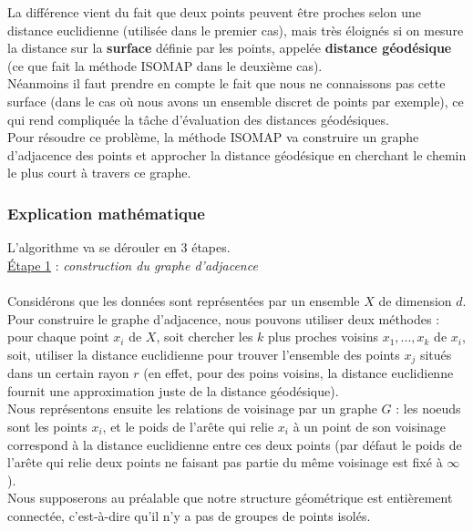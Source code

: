 \documentclass[12pt]{report}
\begin{document}
\noindent La différence vient du fait que deux points peuvent être proches selon une distance euclidienne (utilisée dans le premier cas), mais très éloignés si on mesure la distance sur la \textbf{surface} définie par les points, appelée \textbf{distance géodésique} (ce que fait la méthode ISOMAP dans le deuxième cas).\\

\noindent Néanmoins il faut prendre en compte le fait que nous ne connaissons pas cette surface (dans le cas où nous avons un ensemble discret de points par exemple), ce qui rend compliquée la tâche d'évaluation des distances géodésiques.\\
Pour résoudre ce problème, la méthode ISOMAP va construire un graphe d'adjacence des points et approcher la distance géodésique en cherchant le chemin le plus court à travers ce graphe.

\subsubsection{Explication mathématique}

\noindent L'algorithme va se dérouler en 3 étapes.\\

\noindent \underline{\'Etape 1} : \textit{construction du graphe d'adjacence}\\ \\
Considérons que les données sont représentées par un ensemble $X$ de dimension $d$.\\
Pour construire le graphe d'adjacence, nous pouvons utiliser deux méthodes : pour chaque point $x_{i}$ de $X$, soit chercher les $k$ plus proches voisins $x_{1},...,x_{k}$ de $x_{i}$, soit,  utiliser la distance euclidienne pour trouver l'ensemble des points $x_{j}$ situés dans un certain rayon $r$ (en effet, pour des poins voisins, la distance euclidienne fournit une approximation juste de la distance géodésique).\\
Nous représentons ensuite les relations de voisinage par un graphe $G$ : les noeuds sont les points $x_{i}$, et le poids de l'arête qui relie $x_{i}$ à un point de son voisinage correspond à la distance euclidienne entre ces deux points (par défaut le poids de l'arête qui relie deux points ne faisant pas partie du même voisinage est fixé à $\infty$).\\
Nous supposerons au préalable que notre structure géométrique est entièrement connectée, c'est-à-dire qu'il n'y a pas de groupes de points isolés.\\
\end{document}
